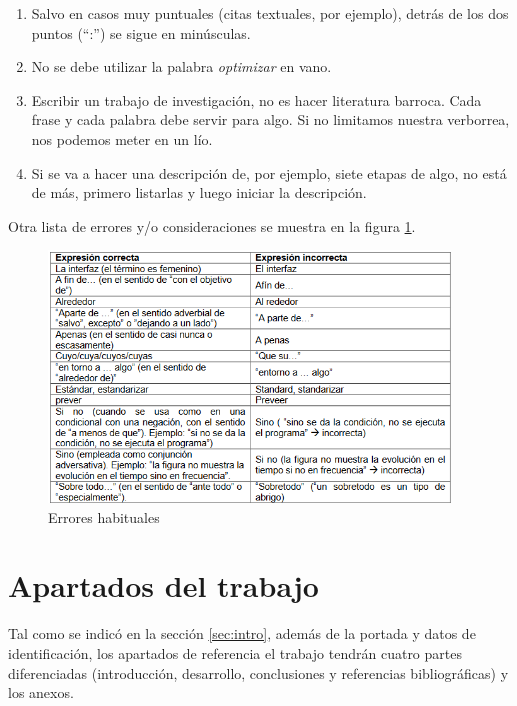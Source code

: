 \begin{enumerate}
\item Salvo en casos muy puntuales (citas textuales, por ejemplo), detrás de los dos puntos (“:”) se sigue en minúsculas.

\item No se debe utilizar la palabra \emph{optimizar} en vano.

\item Escribir  un  trabajo  de  investigación,  no  es  hacer  literatura  barroca.  Cada  frase  y  cada  palabra debe servir para algo. Si no limitamos nuestra verborrea, nos podemos meter en un lío.

\item Si  se  va  a  hacer  una  descripción  de,  por  ejemplo,  siete  etapas  de  algo,  no  está  de  más, primero listarlas y luego iniciar la descripción.



\end{enumerate}

 Otra lista de errores y/o consideraciones se muestra en la figura \ref{fig:errores}.
 
\begin{figure}[h]
	\begin{center}
		\includegraphics[width = 0.95\textwidth]{Figuras/errores}
	\end{center}
	\caption{\label{fig:errores} Errores habituales}
\end{figure}



 
 \chapter{Apartados del trabajo }
\label{sec:apartados}

Tal como se indicó en la sección \ref{sec:intro}, además de la portada y datos de identificación, los apartados de referencia el trabajo tendrán cuatro partes diferenciadas (introducción, desarrollo, conclusiones y  referencias bibliográficas) y los anexos.

